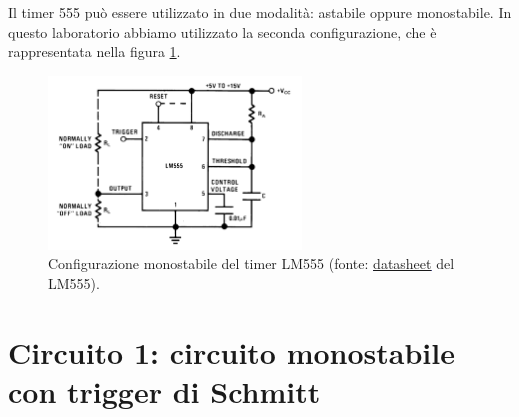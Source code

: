 \documentclass{report}
\begin{document}
Il timer 555 può essere utilizzato in due modalità: astabile oppure monostabile. In questo laboratorio abbiamo utilizzato la seconda configurazione, che è rappresentata nella figura \ref{figura:timer2}.
\begin{figure}[h!]
	\centering
	\includegraphics[height=4.6cm]{immagini/timer3}
	\caption{Configurazione monostabile del timer LM555 (fonte: \textcolor{blue}{\underline{\href{https://www.ti.com/lit/ds/symlink/lm555.pdf?ts=1667144089940&ref_url=https\%253A\%252F\%252Fwww.ti.com\%252Fproduct\%252FLM555}{datasheet}}} del LM555).}
	\label{figura:timer2}
\end{figure}

\newpage
\section{Circuito 1: circuito monostabile con trigger di Schmitt}
\end{document}
